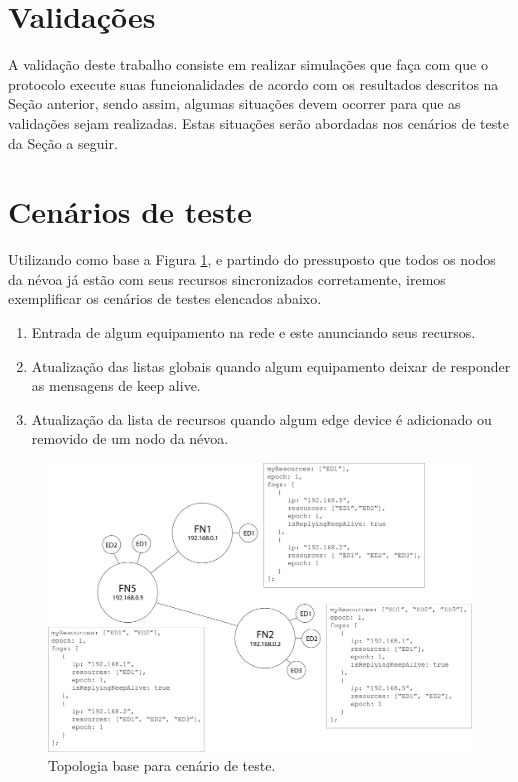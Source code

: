 \section{Validações}

A validação deste trabalho consiste em realizar simulações que faça com que o protocolo execute suas funcionalidades de acordo com os resultados descritos na Seção anterior, sendo assim, 
algumas situações devem ocorrer para que as validações sejam realizadas.
Estas situações serão abordadas nos cenários de teste da Seção a seguir.

\section{Cenários de teste}

Utilizando como base a Figura \ref{fig:fig7}, e partindo do pressuposto que todos os nodos da névoa já estão com seus recursos sincronizados corretamente,
iremos exemplificar os cenários de testes elencados abaixo.

\begin{enumerate}
    \item Entrada de algum equipamento na rede e este anunciando seus recursos. 
    \item Atualização das listas globais quando algum equipamento deixar de responder as mensagens de keep alive.
    \item Atualização da lista de recursos quando algum edge device é adicionado ou removido de um nodo da névoa.
\end{enumerate}

\begin{figure}[H]
    \centering\includegraphics[width=.8\textwidth]{fig7.png}
    \caption%
    {\label{fig:fig7} Topologia base para cenário de teste.}
\end{figure}

